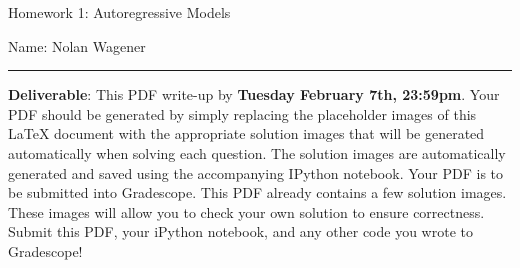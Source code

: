 \documentclass{article}
\newcommand{\ruleskip}{\bigskip\hrule\bigskip}
\begin{document}
\pagestyle{myheadings} 

{\huge
\noindent Homework 1: Autoregressive Models}

\hfill \break
Name: Nolan Wagener
\ruleskip

{\bf Deliverable}: This PDF write-up by {\bf Tuesday February 7th, 23:59pm}.  Your PDF should be generated by simply replacing the placeholder images of this LaTeX document with the appropriate solution images that will be generated automatically when solving each question. The solution images are automatically generated and saved using the accompanying IPython notebook. Your PDF is to be submitted into Gradescope. This PDF already contains a few solution images.  These images will allow you to check your own solution to ensure correctness. Submit this PDF, your iPython notebook, and any other code you wrote to Gradescope!


\vspace{.2in}

\end{document}
